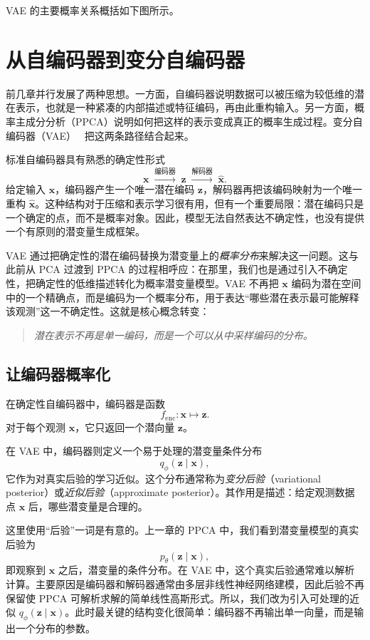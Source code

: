 \medskip
\noindent VAE 的主要概率关系概括如下图所示。

\medskip

\section{从自编码器到变分自编码器}

前几章并行发展了两种思想。一方面，自编码器说明数据可以被压缩为较低维的潜在表示，也就是一种紧凑的内部描述或特征编码，再由此重构输入。另一方面，概率主成分分析（PPCA）说明如何把这样的表示变成真正的概率生成过程。变分自编码器（VAE）~\cite{kingma2014autoencoding,rezende2014stochastic} 把这两条路径结合起来。

标准自编码器具有熟悉的确定性形式
\[
\mathbf{x}
\;\xrightarrow{\text{编码器}}\;
\mathbf{z}
\;\xrightarrow{\text{解码器}}\;
\hat{\mathbf{x}}.
\]
给定输入 \(\mathbf{x}\)，编码器产生一个唯一潜在编码 \(\mathbf{z}\)，解码器再把该编码映射为一个唯一重构 \(\hat{\mathbf{x}}\)。这种结构对于压缩和表示学习很有用，但有一个重要局限：潜在编码只是一个确定的点，而不是概率对象。因此，模型无法自然表达不确定性，也没有提供一个有原则的潜变量生成框架。

VAE 通过把确定性的潜在编码替换为潜变量上的\emph{概率分布}来解决这一问题。这与此前从 PCA 过渡到 PPCA 的过程相呼应：在那里，我们也是通过引入不确定性，把确定性的低维描述转化为概率潜变量模型。VAE 不再把 \(\mathbf{x}\) 编码为潜在空间中的一个精确点，而是编码为一个概率分布，用于表达“哪些潜在表示最可能解释该观测”这一不确定性。这就是核心概念转变：
\begin{quote}
\emph{潜在表示不再是单一编码，而是一个可以从中采样编码的分布。}
\end{quote}

\subsection{让编码器概率化}

在确定性自编码器中，编码器是函数
\[
f_{\text{enc}}:\mathbf{x}\mapsto\mathbf{z}.
\]
对于每个观测 \(\mathbf{x}\)，它只返回一个潜向量 \(\mathbf{z}\)。

在 VAE 中，编码器则定义一个易于处理的潜变量条件分布
\[
q_{\phi}(\mathbf{z}\mid\mathbf{x}),
\]
它作为对真实后验的学习近似。这个分布通常称为\emph{变分后验}（variational posterior）或\emph{近似后验}（approximate posterior）。其作用是描述：给定观测数据点 \(\mathbf{x}\) 后，哪些潜变量是合理的。

这里使用“后验”一词是有意的。上一章的 PPCA 中，我们看到潜变量模型的真实后验为
\[
p_{\theta}(\mathbf{z}\mid\mathbf{x}),
\]
即观察到 \(\mathbf{x}\) 之后，潜变量的条件分布。在 VAE 中，这个真实后验通常难以解析计算。主要原因是编码器和解码器通常由多层非线性神经网络建模，因此后验不再保留使 PPCA 可解析求解的简单线性高斯形式。所以，我们改为引入可处理的近似 \(q_{\phi}(\mathbf{z}\mid\mathbf{x})\)。此时最关键的结构变化很简单：编码器不再输出单一向量，而是输出一个分布的参数。

